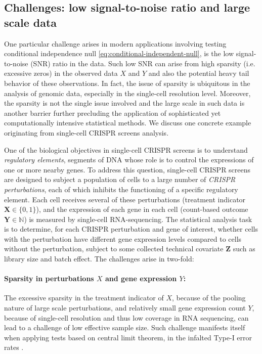 \documentclass[12pt]{article}
\theoremstyle{definition}
\newcommand{\prx}{\bm X}								%
\newcommand{\srx}{X}									%
\newcommand{\prz}{\bm Z}								%
\newcommand{\pry}{{\bm Y}}								%
\newcommand{\sry}{Y}									%
\begin{document}
\subsection{Challenges: low signal-to-noise ratio and large scale data} \label{sec:statistical-computational-challenges}

One particular challenge arises in modern applications involving testing conditional independence null \eqref{eq:conditional-independent-null}, is the low signal-to-noise (SNR) ratio in the data. Such low SNR can arise from high sparsity (i.e. excessive zeros) in the observed data $X$ and $Y$ and also the potential heavy tail behavior of these observations. In fact, the issue of sparsity is ubiquitous in the analysis of genomic data, especially in the single-cell resolution level. Moreover, the sparsity is not the single issue involved and the large scale in such data is another barrier further precluding the application of sophisticated yet computationally intensive statistical methods. We discuss one concrete example originating from single-cell CRISPR screens analysis.

One of the biological objectives in single-cell CRISPR screens \citep{Dixit2016,Adamson2016,Jaitin2016,Datlinger2017} is to understand \textit{regulatory elements}, segments of DNA whose role is to control the expressions of one or more nearby genes. To address this question, single-cell CRISPR screens are designed to subject a population of cells to a large number of \textit{CRISPR perturbations}, each of which inhibits the functioning of a specific regulatory element. Each cell receives several of these perturbations (treatment indicator $\prx\in\{0,1\}$), and the expression of each gene in each cell (count-based outcome $\pry\in\mathbb{N}$) is measured by single-cell RNA-sequencing. The statistical analysis task is to determine, for each CRISPR perturbation and gene of interest, whether cells with the perturbation have different gene expression levels compared to cells without the perturbation, subject to some collected technical covariate $\prz$ such as library size and batch effect. The challenges arise in two-fold: 
\paragraph{Sparsity in perturbations $X$ and gene expression $Y$:}

The excessive sparsity in the treatment indicator of $\srx$, because of the pooling nature of large scale perturbations, and relatively small gene expression count $\sry$, because of single-cell resolution and thus low coverage in RNA sequencing, can lead to a challenge of low effective sample size. Such challenge manifests itself when applying tests based on central limit theorem, in the infalted Type-I error rates \citep{Barry2024}.
\end{document}
